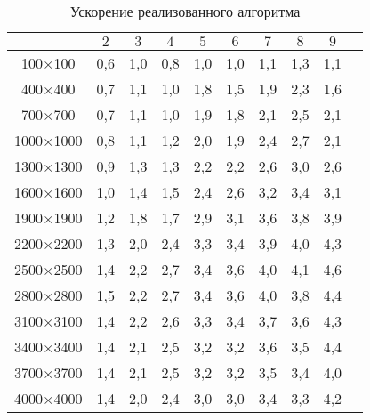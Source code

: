 \documentclass[14pt,a4paper]{extarticle} %
\begin{document}
\begin{table}[h!] 
\caption{Ускорение реализованного алгоритма}
\centering
\begin{tabular}{|c|c|c|c|c|c|c|c|c|c|}\hline
              &$2$ &$3$ &$4$ &$5$ &$6$ &$7$ &$8$  &$9$    \\ \hline
100$\times$100   &0,6 &1,0 &0,8 &1,0 &1,0 &1,1 &1,3 &1,1 \\ \hline
400$\times$400   &0,7 &1,1 &1,0 &1,8 &1,5 &1,9 &2,3 &1,6 \\ \hline
700$\times$700   &0,7 &1,1 &1,0 &1,9 &1,8 &2,1 &2,5 &2,1 \\ \hline
1000$\times$1000 &0,8 &1,1 &1,2 &2,0 &1,9 &2,4 &2,7 &2,1 \\ \hline
1300$\times$1300 &0,9 &1,3 &1,3 &2,2 &2,2 &2,6 &3,0 &2,6 \\ \hline
1600$\times$1600 &1,0 &1,4 &1,5 &2,4 &2,6 &3,2 &3,4 &3,1 \\ \hline
1900$\times$1900 &1,2 &1,8 &1,7 &2,9 &3,1 &3,6 &3,8 &3,9 \\ \hline
2200$\times$2200 &1,3 &2,0 &2,4 &3,3 &3,4 &3,9 &4,0 &4,3 \\ \hline
2500$\times$2500 &1,4 &2,2 &2,7 &3,4 &3,6 &4,0 &4,1 &4,6 \\ \hline
2800$\times$2800 &1,5 &2,2 &2,7 &3,4 &3,6 &4,0 &3,8 &4,4 \\ \hline
3100$\times$3100 &1,4 &2,2 &2,6 &3,3 &3,4 &3,7 &3,6 &4,3 \\ \hline
3400$\times$3400 &1,4 &2,1 &2,5 &3,2 &3,2 &3,6 &3,5 &4,4 \\ \hline
3700$\times$3700 &1,4 &2,1 &2,5 &3,2 &3,2 &3,5 &3,4 &4,0 \\ \hline
4000$\times$4000 &1,4 &2,0 &2,4 &3,0 &3,0 &3,4 &3,3 &4,2 \\ \hline
\end{tabular}

\label{tab:exp3-sp-1}
\end{table}

\clearpage\newpage
\end{document}
